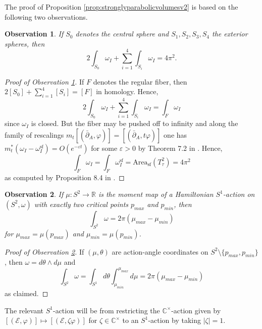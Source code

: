 \documentclass[12pt,letterpaper,reqno]{amsart}
\newtheorem{obs}{Observation}
\theoremstyle{remark}
\theoremstyle{definition}
\numberwithin{thm}{section}
\numberwithin{equation}{section}
\numberwithin{figure}{section}
\newcommand{\R}{\ensuremath{\mathbb R}}
\newcommand{\C}{\ensuremath{\mathbb C}}
\newcommand{\cE}{{\mathcal E}}
\begin{document}
The proof of Proposition \ref{prop:stronglyparabolicvolumesv2} is based on the following two observations.
\begin{obs}\label{obs:1}
If $S_0$ denotes the central sphere and $S_1, S_2, S_3, S_4$ the exterior spheres, then
\[
	2 \int_{S_0} \omega_I + \sum_{i=1}^4 \int_{S_i} \omega_I  = 4 \pi^2.
\]
\end{obs}

\begin{proof}[Proof of Observation \ref{obs:1}]
If $F$ denotes the regular fiber, then $2[S_0] + \sum_{i=1}^4 [S_i] = [F]$ in homology. Hence,
\[
	2 \int_{S_0} \omega_I + \sum_{i=1}^4 \int_{S_i} \omega_I  = \int_{F} \omega_I
\]
since $\omega_I$ is closed. But the fiber may be pushed off to infinity and along the family of rescalings $m_t[(\bar\partial_A,\varphi)] = [(\bar\partial_A,t\varphi)]$ one has $ m_t^*(\omega_I - \omega_I^{\mathrm{sf}} ) = O(e^{- \varepsilon t})$ for some $\varepsilon>0$ by Theorem 7.2 in \cite{FMSW}. Hence, 
\[
\int_{F} \omega_I =\int_{F} \omega^{\mathrm{sf}}_I = \mathrm{Area}_{\mathrm{sf}}(T^2_\tau) = 4 \pi^2 
\]
as computed by Proposition 8.4 in \cite{FMSW}.
\end{proof}
\begin{obs}\label{obs:2}
If $\mu: S^2 \to \R$ is the moment map of a Hamiltonian $S^1$-action on $(S^2,\omega)$ with exactly two critical points $p_{max}$ and $p_{min}$, then
	\[
	\int_{S^2} \omega = 2 \pi ( \mu_{max} - \mu_{min})
	\]
	for $\mu_{max} = \mu(p_{max})$ and $\mu_{min} = \mu(p_{min})$.
\end{obs}

\begin{proof}[Proof of Observation \ref{obs:2}]
If $(\mu, \theta)$ are action-angle coordinates on $S^2 \setminus \{ p_{max}, p_{min}\}$, then $\omega = d\theta \wedge d \mu  $	
and 
\[
\int_{S^2} \omega = \int_{ S^1 }  d\theta  \int_{\mu_{min}}^{\mu_{max}}d \mu = 2 \pi ( \mu_{max} - \mu_{min})
\]
as claimed.
\end{proof}

The relevant $S^1$-action will be from restricting 
the $\C^\times$-action given by $[(\cE, \varphi)] \mapsto [(\cE, \zeta \varphi)]$ for $\zeta \in \C^\times$ to an $S^1$-action by taking $|\zeta|=1$.
\end{document}
